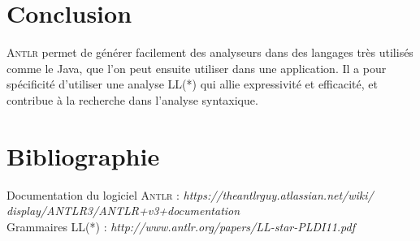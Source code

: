 \documentclass[paper=a4, fontsize=11pt]{scrartcl} %
\numberwithin{equation}{section} %
\numberwithin{figure}{section} %
\numberwithin{table}{section} %
\begin{document}
\section*{Conclusion} %
\textsc{Antlr} permet de générer facilement des analyseurs dans des langages très utilisés comme le Java, que l'on peut ensuite utiliser dans une application. Il a pour spécificité d'utiliser une analyse LL(*) qui allie expressivité et efficacité, et contribue à la recherche dans l'analyse syntaxique.


\section*{Bibliographie} %
\setlength\parindent{0pt}
Documentation du logiciel \textsc{Antlr} : \textit{https://theantlrguy.atlassian.net/wiki/\\display/ANTLR3/ANTLR+v3+documentation}\\
Grammaires LL(*) : \textit{http://www.antlr.org/papers/LL-star-PLDI11.pdf}


\end{document}
